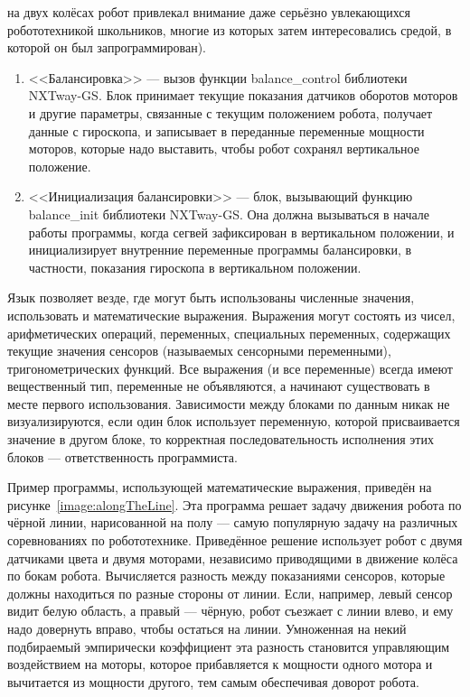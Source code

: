 \begin{enumerate}
		на двух колёсах робот привлекал внимание даже серьёзно увлекающихся робототехникой 
		школьников, многие из которых затем интересовались средой, в которой он был запрограммирован).
		\begin{enumerate}
			\item <<Балансировка>> --- вызов функции balance\_control библиотеки NXTway-GS. 
				Блок принимает текущие показания датчиков оборотов моторов и другие параметры, 
				связанные с текущим положением робота, получает данные с гироскопа, и записывает 
				в переданные переменные мощности моторов, которые надо выставить, чтобы робот 
				сохранял вертикальное положение.
			\item <<Инициализация балансировки>> --- блок, вызывающий функцию balance\_init 
				библиотеки NXTway-GS. Она должна вызываться в начале работы программы, когда 
				сегвей зафиксирован в вертикальном положении, и инициализирует внутренние 
				переменные программы балансировки, в частности, показания гироскопа в вертикальном 
				положении.
		\end{enumerate}
\end{enumerate}

Язык позволяет везде, где могут быть использованы численные значения, использовать 
и математические выражения. Выражения могут состоять из чисел, арифметических операций, переменных, специальных переменных, содержащих текущие значения сенсоров (называемых сенсорными переменными), тригонометрических функций. Все выражения (и все переменные) всегда имеют вещественный тип, переменные не объявляются, а начинают существовать в месте первого использования. Зависимости между блоками по данным никак не визуализируются, если один блок использует переменную, которой присваивается значение в другом блоке, то корректная последовательность исполнения этих блоков --- ответственность программиста. 

Пример программы, использующей математические выражения, приведён на рисунке~\ref{image:alongTheLine}. 
Эта программа решает задачу движения робота по чёрной линии, нарисованной на полу --- 
самую популярную задачу на различных соревнованиях по робототехнике. Приведённое решение 
использует робот с двумя датчиками цвета и двумя моторами, независимо приводящими в 
движение колёса по бокам робота. Вычисляется разность между показаниями сенсоров, 
которые должны находиться по разные стороны от линии. Если, например, левый сенсор 
видит белую область, а правый --- чёрную, робот съезжает с линии влево, и ему надо 
довернуть вправо, чтобы остаться на линии. Умноженная на некий подбираемый эмпирически 
коэффициент эта разность становится управляющим воздействием на моторы, которое прибавляется 
к мощности одного мотора и вычитается из мощности другого, тем самым обеспечивая доворот робота.

